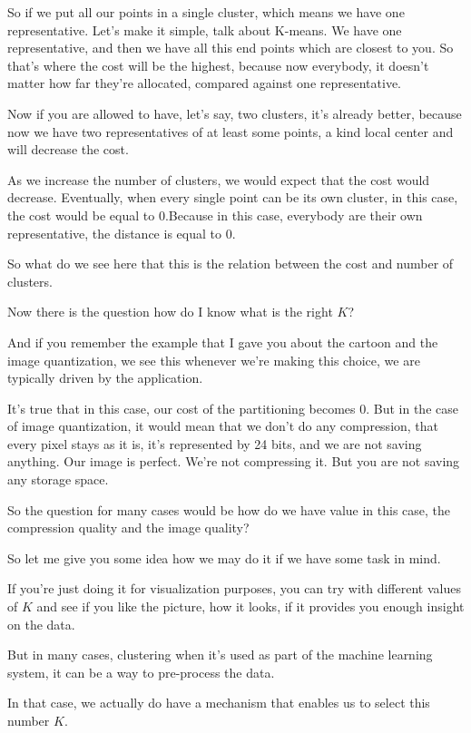 \documentclass[a4paper, 12pt]{article}
\begin{document}
So if we put all our points in a single cluster, which means we have one
representative. Let's make it simple, talk about K-means. We have one
representative, and then we have all this end points which are closest to you.
So that's where the cost will be the highest, because now everybody, it doesn't
matter how far they're allocated, compared against one representative.

Now if you are allowed to have, let's say, two clusters, it's already better,
because now we have two representatives of at least some points, a kind local
center and will decrease the cost.

As we increase the number of clusters, we would expect that the cost would
decrease. Eventually, when every single point can be its own cluster, in this
case, the cost would be equal to \(0\).Because in this case, everybody are their
own representative, the distance is equal to \(0\).

So what do we see here that this is the relation between the cost and number of
clusters.

Now there is the question how do I know what is the right \(K\)?

And if you remember the example that I gave you about the cartoon and the image
quantization, we see this whenever we're making this choice, we are typically
driven by the application.

It's true that in this case, our cost of the partitioning becomes 0. But in the
case of image quantization, it would mean that we don't do any compression, that
every pixel stays as it is, it's represented by 24 bits, and we are not saving
anything. Our image is perfect. We're not compressing it. But you are not saving
any storage space.

So the question for many cases would be how do we have value in this case, the
compression quality and the image quality?

So let me give you some idea how we may do it if we have some task in mind.

If you're just doing it for visualization purposes, you can try with different
values of \(K\) and see if you like the picture, how it looks, if it provides
you enough insight on the data.

But in many cases, clustering when it's used as part of the machine learning
system, it can be a way to pre-process the data.

In that case, we actually do have a mechanism that enables us to select this
number \(K\).
\end{document}
